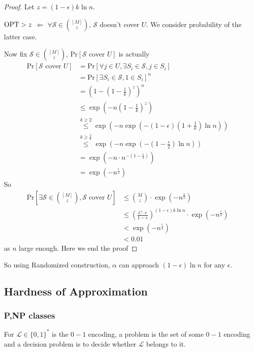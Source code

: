 \begin{proof}
    Let  $ z=(1-\epsilon)k\ln n $.
    
    $ \mathrm{OPT}>z $ $ \Leftarrow $  $ \forall \mathcal{S}\in\binom{[M]}{z} $,  $ \mathcal{S}  $ doesn't cover  $ U $. We consider probability of the latter case.

    Now fix  $ \mathcal{S}\in \binom{[M ]}{z} $,  $ \mathrm{Pr}[\mathcal{S}\text{ cover }U] $ is actually 
    \begin{align*}
        \mathrm{Pr}[\mathcal{S}\text{ cover }U]&=\mathrm{Pr}[\forall j\in U,\exists S_i\in \mathcal{S},j\in S_i]\\
        &=\mathrm{Pr}[\exists S_i\in \mathcal{S},1\in S_i]^n\\
        &=\left(1-(1-\frac{1}{k})^z\right)^n\\
        & \leq \exp(-n(1-\frac{1}{k})^z)\\
        & \overset{k \geq 2}{ \leq } \exp(-n\exp(-(1-\epsilon)(1+\frac{1}{k})\ln n))\\
        & \overset{k \geq \frac{2}{\epsilon }}{ \leq } \exp(-n\exp(-(1-\frac{\epsilon}{2})\ln n))\\
        &=\exp(-n\cdot n^{-(1-\frac{\epsilon}{2})})\\
        &=\exp(-n^{\frac{\epsilon}{2}})
    \end{align*}
    So 
    \begin{align*}
        \mathrm{Pr}[\exists \mathcal{S}\in\binom{[M]}{z},\mathcal{S}\text{ cover }U]& \leq \binom{M}{z}\cdot\exp(-n^{\frac{\epsilon}{2}})\\
        & \leq \left(\frac{C\cdot e}{1-\epsilon}\right)^{(1-\epsilon)k\ln n}\cdot \exp(-n^{\frac{\epsilon}{2}})\\
        &<\exp(-n^{\frac{\epsilon}{4}})\\
        &<0.01
    \end{align*}
    as  $ n  $ large enough.
    Here we end the proof
\end{proof}


So using Randomized construction,  $ \alpha $ can approach  $ (1-\epsilon)\ln n $ for any  $ \epsilon $.

\subsection{Hardness of  Approximation}
\subsubsection{ P,NP classes}
For  $ \mathcal{L }\in \{0,1\}^\ast       $ is  the  $ 0-1 $ encoding, a problem is the set of some  $ 0-1 $ encoding and a decision problem is to decide whether  $ \mathcal{L} $ belongs to it. 

